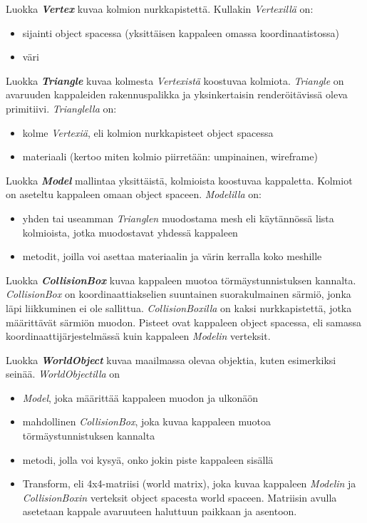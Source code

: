 \documentclass[12pt] {article}
\newcommand{\textbi}[1]{\textit{\textbf{#1}}}
\begin{document}
Luokka \textit{\textbf{Vertex}} kuvaa kolmion nurkkapistettä. Kullakin \textit{Vertexillä} on:
\begin{itemize}
	\item sijainti object spacessa (yksittäisen kappaleen omassa koordinaatistossa)
	\item väri
\end{itemize}

Luokka \textit{\textbf{Triangle}} kuvaa kolmesta \textit{Vertexistä} koostuvaa kolmiota. \textit{Triangle} on avaruuden kappaleiden rakennuspalikka ja yksinkertaisin renderöitävissä oleva primitiivi. \textit{Trianglella} on:
\begin{itemize}
	\item kolme \textit{Vertexiä}, eli kolmion nurkkapisteet object spacessa
	\item materiaali (kertoo miten kolmio piirretään: umpinainen, wireframe)
\end{itemize}

Luokka \textit{\textbf{Model}} mallintaa yksittäistä, kolmioista koostuvaa kappaletta. Kolmiot on aseteltu kappaleen omaan object spaceen. \textit{Modelilla} on:
\begin{itemize}
	\item yhden tai useamman \textit{Trianglen} muodostama mesh eli käytännössä lista kolmioista, jotka muodostavat yhdessä kappaleen
	\item metodit, joilla voi asettaa materiaalin ja värin kerralla koko meshille
\end{itemize}

Luokka \textbi{CollisionBox} kuvaa kappaleen muotoa törmäystunnistuksen kannalta. \textit{CollisionBox} on koordinaattiakselien suuntainen suorakulmainen särmiö, jonka läpi liikkuminen ei ole sallittua. \textit{CollisionBoxilla} on kaksi nurkkapistettä, jotka määrittävät särmiön muodon. Pisteet ovat kappaleen object spacessa, eli samassa koordinaattijärjestelmässä kuin kappaleen \textit{Modelin} verteksit.

Luokka \textit{\textbf{WorldObject}} kuvaa maailmassa olevaa objektia, kuten esimerkiksi seinää. \textit{WorldObjectilla} on
\begin{itemize}
	\item \textit{Model}, joka määrittää kappaleen muodon ja ulkonäön
	\item mahdollinen \textit{CollisionBox}, joka kuvaa kappaleen muotoa törmäystunnistuksen kannalta
	\item metodi, jolla voi kysyä, onko jokin piste kappaleen sisällä
	\item Transform, eli 4x4-matriisi (world matrix), joka kuvaa kappaleen \textit{Modelin} ja \textit{CollisionBoxin} verteksit object spacesta world spaceen. Matriisin avulla asetetaan kappale avaruuteen haluttuun paikkaan ja asentoon.
\end{itemize}
\end{document}
